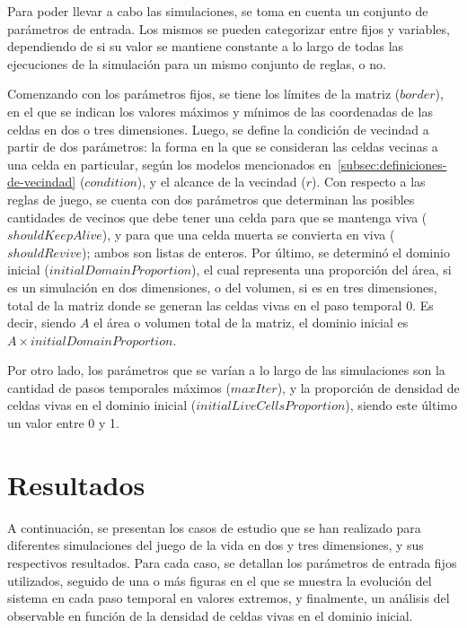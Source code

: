 \documentclass[11pt]{article}
\begin{document}
    Para poder llevar a cabo las simulaciones, se toma en cuenta un conjunto de parámetros de entrada.
    Los mismos se pueden categorizar entre fijos y variables, dependiendo de si su valor se mantiene
    constante a lo largo de todas las ejecuciones de la simulación para un mismo conjunto de reglas, o no.

    Comenzando con los parámetros fijos, se tiene los límites de la matriz ($border$),
    en el que se indican los valores máximos y mínimos de las coordenadas de las celdas en dos o tres dimensiones.
    Luego, se define la condición de vecindad a partir de dos parámetros:
    la forma en la que se consideran las celdas vecinas a una celda en particular, según los modelos mencionados
    en~\ref{subsec:definiciones-de-vecindad} ($condition$), y el alcance de la vecindad ($r$).
    Con respecto a las reglas de juego, se cuenta con dos parámetros que determinan las posibles cantidades de
    vecinos que debe tener una celda para que se mantenga viva ($shouldKeepAlive$),
    y para que una celda muerta se convierta en viva ($shouldRevive$); ambos son listas de enteros.
    Por último, se determinó el dominio inicial ($initialDomainProportion$), el
    cual representa una proporción del área, si es un simulación en dos dimensiones, o del volumen,
    si es en tres dimensiones, total de la matriz donde se generan las celdas vivas en el paso temporal 0.
    Es decir, siendo $A$ el área o volumen total de la matriz, el dominio inicial es $A \times initialDomainProportion$.

    Por otro lado, los parámetros que se varían a lo largo de las simulaciones son la cantidad de pasos temporales
    máximos ($maxIter$), y la proporción de densidad de celdas vivas en el dominio inicial ($initialLiveCellsProportion$),
    siendo este último un valor entre 0 y 1.


    \section{Resultados}\label{sec:resultados}
    A continuación, se presentan los casos de estudio que se han realizado para diferentes simulaciones del juego
    de la vida en dos y tres dimensiones, y sus respectivos resultados.
    Para cada caso, se detallan los parámetros de entrada fijos utilizados, seguido de una o más figuras en el que
    se muestra la evolución del sistema en cada paso temporal en valores extremos, y finalmente, un análisis del
    observable en función de la densidad de celdas vivas en el dominio inicial.
\end{document}
